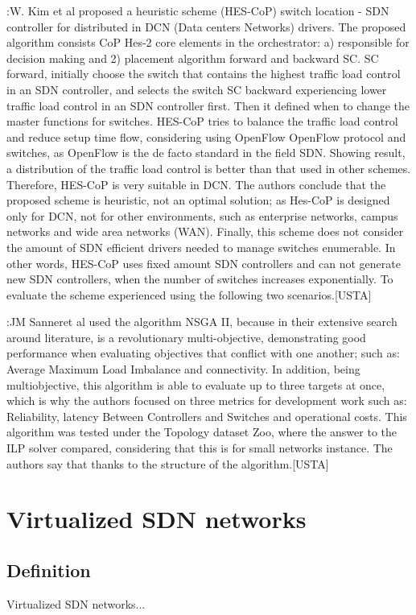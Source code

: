 \documentclass[a4paper,10pt]{article}
\begin{document}
\cite{WoLi15}:W. Kim et al proposed a heuristic scheme (HES-CoP) switch location - SDN controller for distributed in DCN (Data centers Networks) drivers. The proposed algorithm consists CoP Hes-2 core elements in the orchestrator: a) responsible for decision making and 2) placement algorithm forward and backward SC. SC forward, initially choose the switch that contains the highest traffic load control in an SDN controller, and selects the switch SC backward experiencing lower traffic load control in an SDN controller first. Then it defined when to change the master functions for switches. HES-CoP tries to balance the traffic load control and reduce setup time flow, considering using OpenFlow OpenFlow protocol and switches, as OpenFlow is the de facto standard in the field SDN. Showing result, a distribution of the traffic load control is better than that used in other schemes. Therefore, HES-CoP is very suitable in DCN. The authors conclude that the proposed scheme is heuristic, not an optimal solution; as Hes-CoP is designed only for DCN, not for other environments, such as enterprise networks, campus networks and wide area networks (WAN). Finally, this scheme does not consider the amount of SDN efficient drivers needed to manage switches enumerable. In other words, HES-CoP uses fixed amount SDN controllers and can not generate new SDN controllers, when the number of switches increases exponentially. To evaluate the scheme experienced using the following two scenarios.[USTA]

\cite{LiYo16}:JM Sanneret al used the algorithm NSGA II, because in their extensive search around literature, is a revolutionary multi-objective, demonstrating good performance when evaluating objectives that conflict with one another; such as: Average Maximum Load Imbalance and connectivity. In addition, being multiobjective, this algorithm is able to evaluate up to three targets at once, which is why the authors focused on three metrics for development work such as: Reliability, latency Between Controllers and Switches and operational costs. This algorithm was tested under the Topology dataset Zoo, where the answer to the ILP solver compared, considering that this is for small networks instance. The authors say that thanks to the structure of the algorithm.[USTA]


\section{Virtualized SDN networks}
\subsection{Definition}
Virtualized SDN networks...
\end{document}

